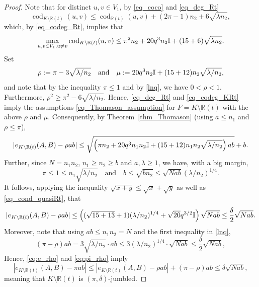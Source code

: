 \documentclass[12pt,reqno]{amsart}
\newcommand{\R} {\mathbb R}
\newcommand{\I} {\mathbb I}
\newcommand{\cod}{\operatorname{cod}}
\theoremstyle{definition}
\begin{document}
\begin{proof}
Note that for distinct $u, v \in V_1$, by \eqref{eq_coco} and \eqref{eq_deg_Rt}
	\begin{equation}
	  \label{eq_cod_compl}
	  \cod_{K \setminus \R(t)}(u, v) \le \cod_{\R(t)}(u,v) + (2 \pi - 1)n_2 + 6\sqrt{\lambda n_2},
	\end{equation}
	which, by \eqref{eq_codeg_Rt}, implies that
	\begin{equation}
	  \label{eq_codeg_KRt}
	  \max_{u, v \in V_1, u \ne v} \cod_{K \setminus \R(t)}(u,v) \le \pi^2 n_2 + 20q^3n_2\I + (\constcodegsRt + 6) \sqrt{\lambda n_2}.
	\end{equation}
	Set
\[
  \rho := \pi - 3\sqrt{\lambda/n_2} \quad \text{and} \quad \mu :=  20q^3n_2\I + (\constcodegsRt + 12) n_2\sqrt{\lambda/ n_2},
\]
and note that by the inequality $\pi\le1$ and by \eqref{lnq}, we have $0 < \rho < 1$. Furthermore, $\rho^2\ge\pi^2-6\sqrt{\lambda/ n_2}$.
Hence, \eqref{eq_deg_Rt} and \eqref{eq_codeg_KRt} imply the  assumptions \eqref{eq_Thomason_assumption} for $F = K \setminus \R(t)$ with the above $\rho$ and $\mu$.
Consequently, by Theorem~\ref{thm_Thomason} (using $a \le n_1$ and $\rho\le\pi$),
		\begin{equation*}
		  |e_{K \setminus \R(t)}(A,B) - \rho ab| \le \sqrt{ \left( \pi n_2 + 20q^3n_1n_2\I + (\constcodegsRt + 12)n_1n_2\sqrt{\lambda /n_2}\right)ab} + b.
	\end{equation*}
	Further, since $N=n_1n_2$, $n_1\ge n_2 \ge b$ and $a,\lambda \ge 1$, we have, with a big margin,
\[
  \pi \le1 \le n_1 \sqrt{\lambda/n_2}\quad\text{and}\quad b \le \sqrt{b n_2} \le \sqrt{Nab}(\lambda/n_2)^{1/4}.
\]
 It follows, applying the inequality $\sqrt{x + y} \le \sqrt x+ \sqrt y$ as well as \eqref{eq_cond_quasiRt}, that
	\begin{equation}
\label{eq:e_rho}
		|e_{K \setminus \R(t)}(A,B) - \rho ab| \le \left( (\sqrt{\constcodegsRt + 13} + 1)(\lambda/n_2)^{1/4} + \sqrt{20} q^{3/2}\I\right) \sqrt{Nab} \le \frac{\delta}{2}\sqrt{Nab}.
	\end{equation}
	Moreover, note that using $ab \le n_1n_2 = N$ and the first inequality in \eqref{lnq},
\begin{equation}
\label{eq:pi_rho}
(\pi - \rho)ab = 3\sqrt{\lambda/n_2} \cdot ab \le 3\left(\lambda/n_2\right)^{1/4} \cdot \sqrt{Nab} \le \frac{\delta}{2}\sqrt{Nab},
\end{equation}
Hence, \eqref{eq:e_rho} and \eqref{eq:pi_rho} imply
\begin{equation*}
	|e_{K \setminus \R(t)}(A,B) - \pi ab| \le |e_{K \setminus \R(t)}(A,B) - \rho ab| + (\pi - \rho)ab \le \delta \sqrt{Nab},
\end{equation*}
meaning that $K \setminus \R(t)$ is $(\pi, \delta)$-jumbled.


\end{proof}
\end{document}

